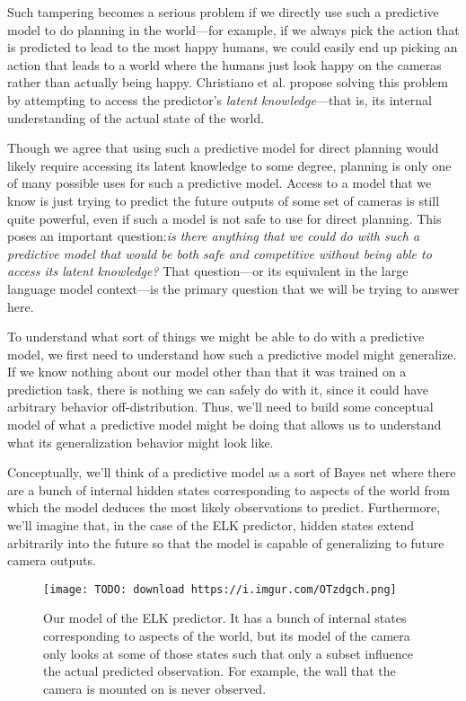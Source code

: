{Such tampering becomes a serious problem if we directly use such a predictive model to do planning in the world---for example, if we always pick the action that is predicted to lead to the most happy humans, we could easily end up picking an action that leads to a world where the humans just look happy on the cameras rather than actually being happy. Christiano et al. propose solving this problem by attempting to access the predictor's \textit{latent knowledge}---that is, its internal understanding of the actual state of the world.

Though we agree that using such a predictive model for direct planning would likely require accessing its latent knowledge to some degree, planning is only one of many possible uses for such a predictive model. Access to a model that we know is just trying to predict the future outputs of some set of cameras is still quite powerful, even if such a model is not safe to use for direct planning. This poses an important question:\textit{is there anything that we could do with such a predictive model that would be both safe and competitive without being able to access its latent knowledge?} That question---or its equivalent in the large language model context---is the primary question that we will be trying to answer here.

To understand what sort of things we might be able to do with a predictive model, we first need to understand how such a predictive model might generalize. If we know nothing about our model other than that it was trained on a prediction task, there is nothing we can safely do with it, since it could have arbitrary behavior off-distribution. Thus, we'll need to build some conceptual model of what a predictive model might be doing that allows us to understand what its generalization behavior might look like.

Conceptually, we'll think of a predictive model as a sort of Bayes net\cite{TODO: cite https://en.wikipedia.org/wiki/Bayesian_network} where there are a bunch of internal hidden states corresponding to aspects of the world from which the model deduces the most likely observations to predict. Furthermore, we'll imagine that, in the case of the ELK predictor, hidden states extend arbitrarily into the future so that the model is capable of generalizing to future camera outputs.

\begin{figure}[h!]
  \centering
  \texttt{[image: TODO: download https://i.imgur.com/OTzdgch.png]}
  \caption{Our model of the ELK predictor. It has a bunch of internal states corresponding to aspects of the world, but its model of the camera only looks at some of those states such that only a subset influence the actual predicted observation. For example, the wall that the camera is mounted on is never observed.}
\end{figure}

}
